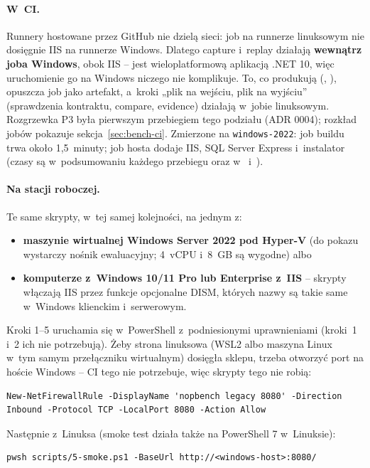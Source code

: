 \paragraph{W~CI.} Runnery hostowane przez GitHub nie dzielą sieci: job na runnerze linuksowym nie dosięgnie
IIS na runnerze Windows. Dlatego capture i~replay działają \textbf{wewnątrz joba Windows},
obok IIS --  jest wieloplatformową aplikacją .NET 10, więc uruchomienie go na
Windows niczego nie komplikuje. To, co produkują (, ),
opuszcza job jako artefakt, a~kroki „plik na wejściu, plik na wyjściu” (sprawdzenia
kontraktu, compare, evidence) działają w~jobie linuksowym. Rozgrzewka P3 była pierwszym
przebiegiem tego podziału (ADR 0004); rozkład jobów pokazuje
sekcja~\ref{sec:bench-ci}. Zmierzone na \texttt{windows-2022}: job buildu trwa
około 1,5~minuty; job hosta dodaje IIS, SQL Server Express i~instalator (czasy są
w~podsumowaniu każdego przebiegu oraz w~
i~).

\paragraph{Na stacji roboczej.} Te same skrypty, w~tej samej kolejności, na jednym z:
\begin{itemize}
  \item \textbf{maszynie wirtualnej Windows Server 2022 pod Hyper-V} (do pokazu wystarczy
    nośnik ewaluacyjny; 4~vCPU i~8~GB są wygodne) albo
  \item \textbf{komputerze z~Windows 10/11 Pro lub Enterprise z~IIS} -- skrypty włączają
    IIS przez funkcje opcjonalne DISM, których nazwy są takie same w~Windows klienckim
    i~serwerowym.
\end{itemize}
Kroki 1--5 uruchamia się w~PowerShell z~podniesionymi uprawnieniami (kroki~1 i~2 ich nie
potrzebują). Żeby strona linuksowa (WSL2 albo maszyna Linux w~tym samym przełączniku
wirtualnym) dosięgła sklepu, trzeba otworzyć port na hoście Windows -- CI tego nie
potrzebuje, więc skrypty tego nie robią:

\begin{lstlisting}
New-NetFirewallRule -DisplayName 'nopbench legacy 8080' -Direction Inbound -Protocol TCP -LocalPort 8080 -Action Allow
\end{lstlisting}

Następnie z~Linuksa (smoke test działa także na PowerShell 7 w~Linuksie):

\begin{lstlisting}
pwsh scripts/5-smoke.ps1 -BaseUrl http://<windows-host>:8080/
\end{lstlisting}

